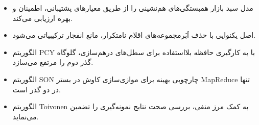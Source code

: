 \begin{summarybox}
\begin{itemize}
    \item مدل سبد بازار همبستگی‌های هم‌نشینی را از طریق معیارهای پشتیبانی، اطمینان و بهره ارزیابی می‌کند.
    \item اصل یکنوایی با حذف اَبَرمجموعه‌های اقلام نامتکرار، مانع انفجار ترکیبیاتی می‌شود.
    \item الگوریتم PCY با به کارگیری حافظه بلااستفاده برای سطل‌های درهم‌سازی، گلوگاه گذر دوم را مرتفع می‌سازد.
    \item الگوریتم SON چارچوبی بهینه برای موازی‌سازی کاوش در بستر MapReduce تنها در دو گذر است.
    \item الگوریتم Toivonen به کمک مرز منفی، بررسی صحت نتایج نمونه‌گیری را تضمین می‌نماید.
\end{itemize}
\end{summarybox}
